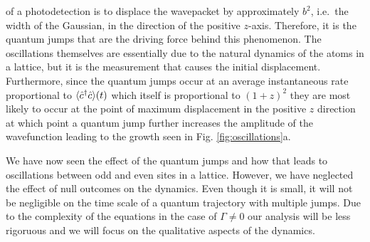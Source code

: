 of a photodetection is to displace the wavepacket by approximately
$b^2$, i.e.~the width of the Gaussian, in the direction of the
positive $z$-axis. Therefore, it is the quantum jumps that are the
driving force behind this phenomenon. The oscillations themselves are
essentially due to the natural dynamics of the atoms in a lattice, but
it is the measurement that causes the initial
displacement. Furthermore, since the quantum jumps occur at an average
instantaneous rate proportional to $\langle \hat{c}^\dagger \hat{c} \rangle (t)$ which
itself is proportional to $(1+z)^2$ they are most likely to occur at
the point of maximum displacement in the positive $z$ direction at
which point a quantum jump further increases the amplitude of the
wavefunction leading to the growth seen in
Fig. \ref{fig:oscillations}a.

We have now seen the effect of the quantum jumps and how that leads to
oscillations between odd and even sites in a lattice. However, we have
neglected the effect of null outcomes on the dynamics. Even though it
is small, it will not be negligible on the time scale of a quantum
trajectory with multiple jumps. Due to the complexity of the equations
in the case of $\Gamma \ne 0$ our analysis will be less rigoruous and
we will focus on the qualitative aspects of the dynamics.

